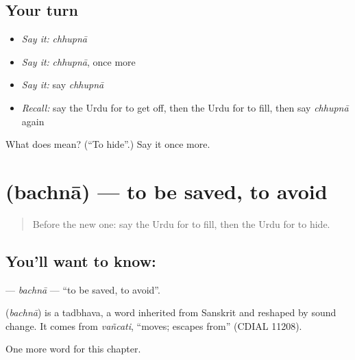 \subsection*{Your turn}
\begin{itemize}
\raggedright
  \item \emph{Say it:} \emph{chhupnā}
  \item \emph{Say it:} \emph{chhupnā}, once more
  \item \emph{Say it:} say \emph{chhupnā}
  \item \emph{Recall:} say the Urdu for to get off, then the Urdu for to fill, then say \emph{chhupnā} again
\end{itemize}

\begin{tcolorbox}[breakable,colback=teal!4,colframe=teal!35!black,title={Before you move on}]
What does  mean? (\textquotedblleft{}To hide\textquotedblright{}.) Say it once more.
\end{tcolorbox}
\section[\texorpdfstring{\ur{بچنا} (bachnā)}{بچنا (bachnā)}]{ (bachnā) — to be saved, to avoid}

\label{lesson:UR-C142-bachna}



\begin{quote}
Before the new one: say the Urdu for to fill, then the Urdu for to hide.
\end{quote}

\subsection*{You'll want to know: }
\textbf{} — \emph{bachnā} — \textquotedblleft{}to be saved, to avoid\textquotedblright{}.

\begin{cousinweb}
\textbf{} (\emph{bachnā}) is a tadbhava, a word inherited from Sanskrit and reshaped by sound change. It comes from \emph{vañcati}, \textquotedblleft{}moves; escapes from\textquotedblright{} (CDIAL 11208).
\end{cousinweb}

\begin{grammarlens}[title={What you've built}]
One more word for this chapter.
\end{grammarlens}

